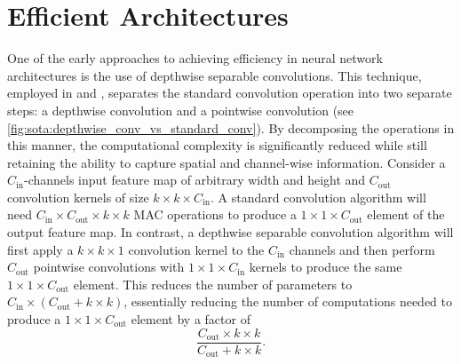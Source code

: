 

\section{Efficient Architectures}


One of the early approaches to achieving efficiency in neural network
architectures is the use of depthwise separable convolutions. This technique,
employed in \cite{howard2017mobilenets} and \cite{DBLP:conf/icml/TanL19},
separates the standard convolution operation into two separate steps: a
depthwise convolution and a pointwise convolution (see
\cref{fig:sota:depthwise_conv_vs_standard_conv}). By decomposing the operations
in this manner, the computational complexity is significantly reduced while
still retaining the ability to capture spatial and channel-wise information.
Consider a $C_\text{in}$-channels input feature map of arbitrary width and
height and $C_\text{out}$ convolution kernels of size $k\times k \times
C_\text{in}$. A standard convolution algorithm will need $C_\text{in} \times
C_\text{out} \times k \times k$ \ac{MAC} operations to produce a $1 \times 1
\times C_\text{out}$ element of the output feature map. In contrast, a depthwise
separable convolution algorithm will first apply a $k\times k \times 1$
convolution kernel to the $C_\text{in}$ channels and then perform $C_\text{out}$
pointwise convolutions with $1\times 1 \times C_\text{in}$ kernels to produce
the same $1\times 1 \times C_\text{out}$ element. This reduces the number of parameters to
$C_\text{in} \times (C_\text{out} + k \times k)$, essentially reducing the
number of computations needed to produce a $1 \times 1 \times C_\text{out}$
element by a factor of\\

$$\displaystyle\frac{C_\text{out}\times k \times k}{C_\text{out} + k \times k}.$$\\

